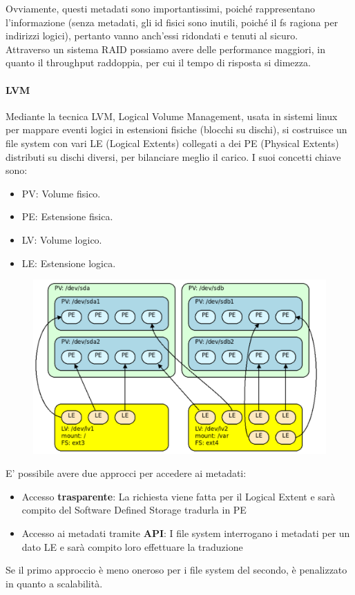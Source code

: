 \documentclass{article}
\begin{document}
		Ovviamente, questi metadati sono importantissimi, poiché rappresentano l’informazione (senza metadati, gli id fisici sono inutili, poiché il fs ragiona per indirizzi logici), pertanto vanno anch’essi ridondati e tenuti al sicuro.\\
		
		Attraverso un sistema RAID possiamo avere delle performance maggiori, in quanto il throughput raddoppia, per cui il tempo di risposta si dimezza.\\
		
		\paragraph{LVM}
		Mediante la tecnica LVM, Logical Volume Management, usata in sistemi linux per mappare eventi logici in estensioni fisiche (blocchi su dischi), si costruisce un file system con vari LE (Logical Extents) collegati a dei PE (Physical Extents) distributi su dischi diversi, per bilanciare meglio il carico. 
		I suoi concetti chiave sono:
		\begin{itemize}
		    \item PV: Volume fisico.
		    \item PE: Estensione fisica.
		    \item LV: Volume logico.
		    \item LE: Estensione logica.
		\end{itemize}
		
		\begin{figure}[ht]
			\centering
			\includegraphics[width=0.7\linewidth]{images/SAC_B5_blockbased}
		\end{figure}
		
		E' possibile avere due approcci per accedere ai metadati:
		\begin{itemize}
		    \item Accesso \textbf{trasparente}: La richiesta viene fatta per il Logical Extent e sarà compito del Software Defined Storage tradurla in PE
		    \item Accesso ai metadati tramite \textbf{API}: I file system interrogano i metadati per un dato LE e sarà compito loro effettuare la traduzione
		\end{itemize}
		Se il primo approccio è meno oneroso per i file system del secondo, è penalizzato in quanto a scalabilità.\\
		
\end{document}
